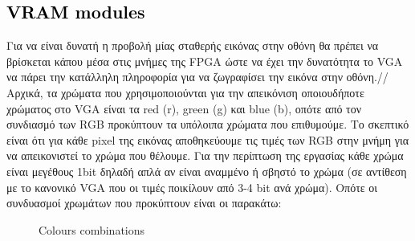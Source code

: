 \documentclass[12pt,a4paper]{article}
\begin{document}
	\subsection{\textcolor{black}{VRAM modules} }
	Για να είναι δυνατή η προβολή μίας σταθερής εικόνας στην οθόνη θα πρέπει να βρίσκεται κάπου μέσα στις μνήμες της FPGA ώστε να έχει την δυνατότητα το VGA να πάρει την κατάλληλη πληροφορία για να ζωγραφίσει την εικόνα στην οθόνη.//
	Αρχικά, τα χρώματα που χρησιμοποιούνται για την απεικόνιση οποιουδήποτε χρώματος στο VGA είναι τα red (r), green (g) και blue (b), οπότε από τον συνδιασμό των RGΒ προκύπτουν τα υπόλοιπα χρώματα που επιθυμούμε. Το σκεπτικό είναι ότι για κάθε pixel της εικόνας αποθηκεύουμε τις τιμές των RGB στην μνήμη για να απεικονιστεί το χρώμα που θέλουμε. Για την περίπτωση της εργασίας κάθε χρώμα είναι μεγέθους 1bit δηλαδή απλά αν είναι αναμμένο ή σβηστό το χρώμα (σε αντίθεση με το κανονικό VGA που οι τιμές ποικίλουν από 3-4 bit ανά χρώμα). Οπότε οι συνδυασμοί χρωμάτων που προκύπτουν είναι οι παρακάτω:
	\begin{figure} [htbp]
		\caption{Colours combinations}
		\label{Colours combinations}
	\end{figure}
	
\end{document}
